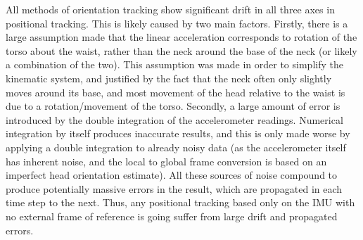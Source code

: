 \documentclass[11pt,a4paper]{article}
\begin{document}
	All methods of orientation tracking show significant drift in all three axes in positional tracking. This is likely caused by two main factors. Firstly, there is a large assumption made that the linear acceleration corresponds to rotation of the torso about the waist, rather than the neck around the base of the neck (or likely a combination of the two). This assumption was made in order to simplify the kinematic system, and justified by the fact that the neck often only slightly moves around its base, and most movement of the head relative to the waist is due to a rotation/movement of the torso. Secondly, a large amount of error is introduced by the double integration of the accelerometer readings. Numerical integration by itself produces inaccurate results, and this is only made worse by applying a double integration to already noisy data (as the accelerometer itself has inherent noise, and the local to global frame conversion is based on an imperfect head orientation estimate). All these sources of noise compound to produce potentially massive errors in the result, which are propagated in each time step to the next. Thus, any positional tracking based only on the IMU with no external frame of reference is going suffer from large drift and propagated errors.
\end{document}
